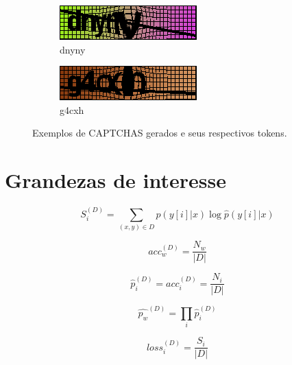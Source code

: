 \begin{figure}[ht]
	\begin{subfigure}{.5\textwidth}
		\centering
		\includegraphics[width=.9\linewidth]{figuras/12248_dnyny.png}
		\caption{dnyny}
	\end{subfigure}
	\begin{subfigure}{.5\textwidth}
		\centering
		\includegraphics[width=.9\linewidth]{figuras/8873_g4cxh.png}
		\caption{g4cxh}
	\end{subfigure}%
	\vspace{.05\linewidth}

	\caption{Exemplos de CAPTCHAS gerados e seus respectivos tokens.}
\end{figure}



\section{Grandezas de interesse}

\begin{equation}
	S_i^{(D)} = \sum_{(x,y) \in D} p(y[i]|x) \log \hat{p}(y[i]|x)
\end{equation}

\begin{equation}
	acc_w^{(D)} = \frac{N_w}{|D|}
\end{equation}

\begin{equation}
\hat{p}_i^{(D)} = acc_i^{(D)} = \frac{N_i}{|D|}
\end{equation}

\begin{equation}
\hat{p_w}^{(D)} = \prod_{i} \hat{p}_i^{(D)}
\end{equation}

\begin{equation}
loss_i^{(D)} = \frac{S_i}{|D|}
\end{equation}


